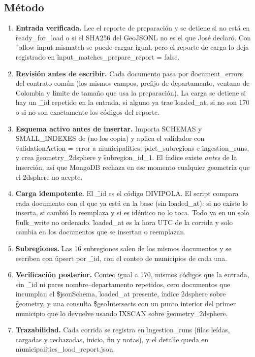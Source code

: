 \subsection{Método}

\begin{enumerate}
  \item \textbf{Entrada verificada.} Lee el reporte de preparación y se detiene si no está en \f{ready\_for\_load} o si el SHA256 del GeoJSONL no es el que José declaró. Con \f{--allow-input-mismatch} se puede cargar igual, pero el reporte de carga lo deja registrado en \f{input\_matches\_prepare\_report = false}.
  \item \textbf{Revisión antes de escribir.} Cada documento pasa por \f{document\_errors} del contrato común (los mismos campos, prefijo de departamento, ventana de Colombia y límite de tamaño que usa la preparación). La carga se detiene si hay un \f{\_id} repetido en la entrada, si alguno ya trae \f{loaded\_at}, si no son 170 o si no son exactamente los códigos del reporte.
  \item \textbf{Esquema activo antes de insertar.} Importa \f{SCHEMAS} y \f{SMALL\_INDEXES} de  (no los copia) y aplica el validador con \f{validationAction = error} a \f{municipalities}, \f{pdet\_subregions} e \f{ingestion\_runs}, y crea \f{geometry\_2dsphere} y \f{subregion\_id\_1}. El índice existe \emph{antes} de la inserción, así que MongoDB rechaza en ese momento cualquier geometría que el \f{2dsphere} no acepte.
  \item \textbf{Carga idempotente.} El \f{\_id} es el código DIVIPOLA. El script compara cada documento con el que ya está en la base (sin \f{loaded\_at}): si no existe lo inserta, si cambió lo reemplaza y si es idéntico no lo toca. Todo va en un solo \f{bulk\_write} no ordenado. \f{loaded\_at} es la hora UTC de la corrida y solo cambia en los documentos que se insertan o reemplazan.
  \item \textbf{Subregiones.} Las 16 subregiones salen de los mismos documentos y se escriben con \f{upsert} por \f{\_id}, con el conteo de municipios de cada una.
  \item \textbf{Verificación posterior.} Conteo igual a 170, mismos códigos que la entrada, sin \f{\_id} ni pares nombre--departamento repetidos, cero documentos que incumplan el \f{\$jsonSchema}, \f{loaded\_at} presente, índice \f{2dsphere} sobre \f{geometry}, y una consulta \f{\$geoIntersects} con un punto interior del primer municipio que lo devuelve usando \f{IXSCAN} sobre \f{geometry\_2dsphere}.
  \item \textbf{Trazabilidad.} Cada corrida se registra en \f{ingestion\_runs} (filas leídas, cargadas y rechazadas, inicio, fin y notas), y el detalle queda en \f{municipalities\_load\_report.json}.
\end{enumerate}

